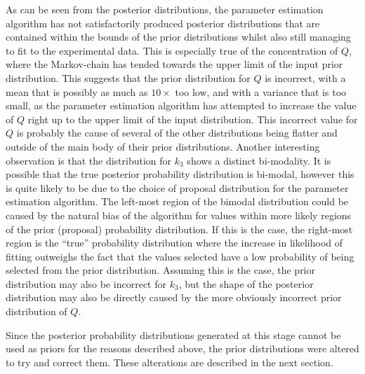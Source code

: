 As can be seen from the posterior distributions, the parameter estimation algorithm has not satisfactorily produced posterior distributions that are contained within the bounds of the prior distributions whilst also still managing to fit to the experimental data. This is especially true of the concentration of $Q$, where the Markov-chain has tended towards the upper limit of the input prior distribution. This suggests that the prior distribution for $Q$ is incorrect, with a mean that is possibly as much as $10\times$ too low, and with a variance that is too small, as the parameter estimation algorithm has attempted to increase the value of $Q$ right up to the upper limit of the input distribution. This incorrect value for $Q$ is probably the cause of several of the other distributions being flatter and outside of the main body of their prior distributions. Another interesting observation is that the distribution for $k_3$ shows a distinct bi-modality. It is possible that the true posterior probability 
distribution is bi-modal, however this is quite likely to be due to the choice of proposal distribution for the parameter estimation algorithm. The left-most region of the bimodal distribution could be caused by the natural bias of the algorithm for values within more likely regions of the prior (proposal) probability distribution. If this is the case, the right-most region is the ``true'' probability distribution where the increase in likelihood of fitting outweighs the fact that the values selected have a low probability of being selected from the prior distribution. Assuming this is the case, the prior distribution may also be incorrect for $k_3$, but the shape of the posterior distribution may also be directly caused by the more obviously incorrect prior distribution of $Q$.

Since the posterior probability distributions generated at this stage cannot be used as priors for the reasons described above, the prior distributions were altered to try and correct them. These alterations are described in the next section.


